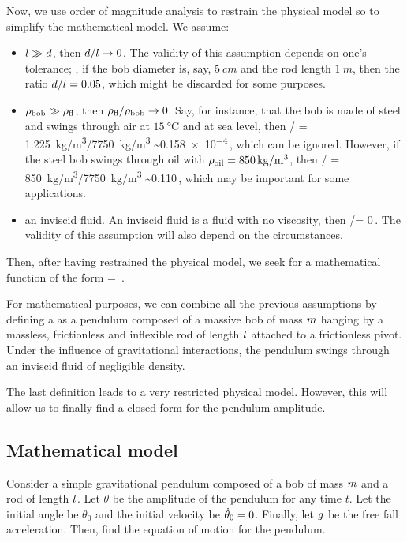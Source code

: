 Now, we use order of magnitude analysis to restrain the physical model so to simplify the mathematical model. We assume:
\begin{itemize}
\item $l\gg d$, then $d/l\to 0$. The validity of this assumption depends on one's tolerance; \eg, if the bob diameter is, say, $\SI{5}{cm}$ and the rod length $\SI{1}{m}$, then the ratio $d/l = 0.05$, which might be discarded for some purposes.
%
\item $\rho_\text{bob}\gg\rho_\text{fl}$, then $\rho_\text{fl}/\rho_\text{bob}\to 0$. Say, for instance, that the bob is made of steel and swings through air at $\SI{15}{\celsius}$ and at sea level, then 
\beq
\dens{}/\dens{} = \SI{1.225}{kg/m^3}/\SI{7750}{kg/m^3} \sim \num{0.158e-4}\,, 
\eeq
which can be ignored. However, if the steel bob swings through oil with $\rho_\text{oil} = \SI{850}{kg/m^3}$, then 
\beq
\dens{}/\dens{} = \SI{850}{kg/m^3}/\SI{7750}{kg/m^3} \sim \num{0.110}\,, 
\eeq
which may be important for some applications.
%
\item an inviscid fluid. An inviscid fluid is a fluid with no viscosity, then 
\beq
\dens{}\diam\sqrt{\length\grav}/\dynvis = 0\,. 
\eeq
The validity of this assumption will also depend on the circumstances.
\end{itemize}

Then, after having restrained the physical model, we seek for a mathematical function of the form
\beq
\theta = \kdimf{}\,.
\eeq

For mathematical purposes, we can combine all the previous assumptions by defining a  as a pendulum composed of a massive bob of mass $m$ hanging by a massless, frictionless and inflexible rod of length $l$ attached to a frictionless pivot. Under the influence of gravitational interactions, the pendulum swings through an inviscid fluid of negligible density.

The last definition leads to a very restricted physical model. However, this will allow us to finally find a closed form for the pendulum amplitude.

\newcommand{\angpos}{\theta}     %
\newcommand{\angvel}{\dt\theta}  %
\newcommand{\angacc}{\ddt\theta} %


\subsection{Mathematical model}
Consider a simple gravitational pendulum composed of a bob of mass $m$ and a rod of length $l$. Let $\angpos$ be the amplitude of the pendulum for any time $t$. Let the initial angle be $\angpos_0$ and the initial velocity be $\angvel_0 = 0$. Finally, let $g$ be the free fall acceleration. Then, find the equation of motion for the pendulum.

